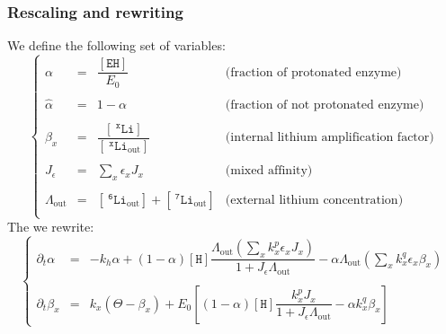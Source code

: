 \documentclass[aps,onecolumn,10pt]{revtex4}
\newcommand{\mychem}[1]{\mathtt{#1}}
\newcommand{\myconc}[1]{\left\lbrack{#1}\right\rbrack}
\newcommand{\spLi}[1]{{~^{\mychem{#1}}\mychem{Li}}}
\newcommand{\Li}[1]{\myconc{\spLi{#1}}}
\newcommand{\spLiOut}[1]{{\spLi{#1}}_{\mathrm{out}}}
\newcommand{\LiOut}[1]{\myconc{\spLiOut{#1}}}
\newcommand{\spEHin}{\mychem{EH}}
\newcommand{\EHin}{\myconc{\spEHin}}
\newcommand{\spproton}{\mychem{H}}
\newcommand{\proton}{\myconc{\spproton}}
\newcommand{\LiAll}{\Lambda}
\newcommand{\LiAllOut}{{\LiAll}_{\mathrm{out}}}
\begin{document}
\subsubsection{Rescaling and rewriting}
We define the following set of variables:
\begin{equation}
\label{eq:scale}
\left\lbrace
\begin{array}{rcll}
	\alpha & = & \dfrac{\EHin}{E_0} & \text{(fraction of protonated enzyme)}\\
	\\
	\hat\alpha & = & 1-\alpha       & \text{(fraction of not protonated enzyme)}\\
	\\
	\beta_x    & = & \dfrac{\Li{x}}{\LiOut{x}} & \text{(internal lithium amplification factor)}\\
	\\
	J_\epsilon & = & \sum_x \epsilon_x J_x & \text{(mixed affinity)}\\
	\\
	\LiAllOut  & = & \LiOut{6} + \LiOut{7} & \text{(external lithium concentration)}\\
\end{array}
\right.
\end{equation}
The we rewrite:
\begin{equation}
\label{eq:sysnew}
\left\lbrace
\begin{array}{rcl}
	\partial_t \alpha & = & -k_h \alpha + (1-\alpha) \proton  \dfrac{\LiAllOut \left(\sum_x k^p_x \epsilon_x J_x\right) }{1+J_\epsilon \LiAllOut}
	-\alpha \LiAllOut \left(\sum_x k^q_x \epsilon_x \beta_x \right)
	\\
	\\
	\partial_t \beta_x & = & k_x\left(\Theta - \beta_x\right) +E_0\left[ (1-\alpha)  \proton \dfrac{k^p_x J_x}{1+J_\epsilon \LiAllOut} - \alpha k^q_x \beta_x \right]
\end{array}
\right.
\end{equation}
\end{document}
